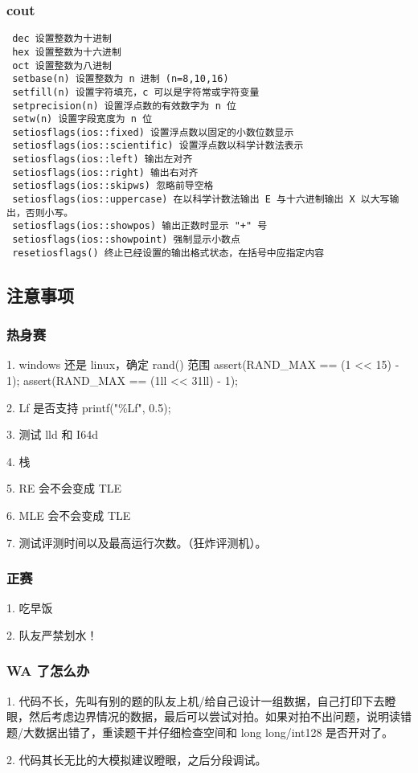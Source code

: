 \documentclass[UTF8]{ctexart}
\begin{document}
\subsubsection{cout}

\begin{framed}
\begin{lstlisting}
 dec 设置整数为十进制
 hex 设置整数为十六进制
 oct 设置整数为八进制
 setbase(n) 设置整数为 n 进制 (n=8,10,16)
 setfill(n) 设置字符填充，c 可以是字符常或字符变量
 setprecision(n) 设置浮点数的有效数字为 n 位
 setw(n) 设置字段宽度为 n 位
 setiosflags(ios::fixed) 设置浮点数以固定的小数位数显示
 setiosflags(ios::scientific) 设置浮点数以科学计数法表示
 setiosflags(ios::left) 输出左对齐
 setiosflags(ios::right) 输出右对齐
 setiosflags(ios::skipws) 忽略前导空格
 setiosflags(ios::uppercase) 在以科学计数法输出 E 与十六进制输出 X 以大写输出，否则小写。
 setiosflags(ios::showpos) 输出正数时显示 "+" 号
 setiosflags(ios::showpoint) 强制显示小数点
 resetiosflags() 终止已经设置的输出格式状态，在括号中应指定内容
\end{lstlisting}
\end{framed}

\subsection{注意事项}

\subsubsection{热身赛}

1. windows 还是 linux，确定 rand() 范围 assert(RAND\_MAX == (1 << 15) - 1); assert(RAND\_MAX == (1ll << 31ll) - 1);

2. Lf 是否支持 printf("\%Lf", 0.5);

3. 测试 lld 和 I64d

4. 栈

5. RE 会不会变成 TLE

6. MLE 会不会变成 TLE

7. 测试评测时间以及最高运行次数。（狂炸评测机）。

\subsubsection{正赛}

1. 吃早饭

2. 队友严禁划水！

\subsubsection{WA 了怎么办}

1. 代码不长，先叫有别的题的队友上机/给自己设计一组数据，自己打印下去瞪眼，然后考虑边界情况的数据，最后可以尝试对拍。如果对拍不出问题，说明读错题/大数据出错了，重读题干并仔细检查空间和 long long/int128 是否开对了。

2. 代码其长无比的大模拟建议瞪眼，之后分段调试。
\end{document}
